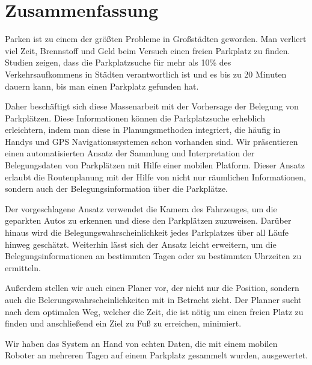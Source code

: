 \chapter*{Zusammenfassung}
\label{cha:zusammenfassung}

Parken ist zu einem der größten Probleme in Großstädten geworden. Man verliert
viel Zeit, Brennstoff und Geld beim Versuch einen freien Parkplatz zu finden.
Studien zeigen, dass die Parkplatzsuche für mehr als 10\% des
Verkehrsaufkommens in Städten verantwortlich ist und es bis zu 20 Minuten
dauern kann, bis man einen Parkplatz gefunden hat.

Daher beschäftigt sich diese Massenarbeit mit der Vorhersage der Belegung von
Parkplätzen. Diese Informationen können die Parkplatzsuche erheblich
erleichtern, indem man diese in Planungsmethoden integriert, die häufig in
Handys und GPS Navigationssystemen schon vorhanden sind. Wir präsentieren
einen automatisierten Ansatz der Sammlung und Interpretation der
Belegungsdaten von Parkplätzen mit Hilfe einer mobilen Platform. Dieser Ansatz
erlaubt die Routenplanung mit der Hilfe von nicht nur räumlichen
Informationen, sondern auch der Belegungsinformation über die Parkplätze.

Der vorgeschlagene Ansatz verwendet die Kamera des Fahrzeuges, um die
geparkten Autos zu erkennen und diese den Parkplätzen zuzuweisen. Darüber
hinaus wird die Belegungswahrscheinlichkeit jedes Parkplatzes über all Läufe
hinweg geschätzt. Weiterhin lässt sich der Ansatz leicht erweitern, um die
Belegungsinformationen an bestimmten Tagen oder zu bestimmten Uhrzeiten zu
ermitteln.

Außerdem stellen wir auch einen Planer vor, der nicht nur die Position,
sondern auch die Belerungswahrscheinlichkeiten mit in Betracht zieht. Der
Planner sucht nach dem optimalen Weg, welcher die Zeit, die ist nötig um einen
freien Platz zu finden und anschließend ein Ziel zu Fuß zu erreichen,
minimiert.

Wir haben das System an Hand von echten Daten, die mit einem mobilen Roboter
an mehreren Tagen auf einem Parkplatz gesammelt wurden, ausgewertet.
